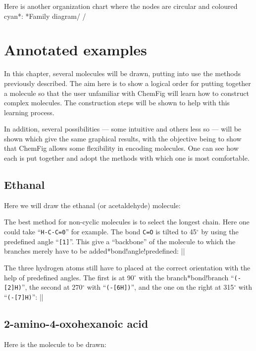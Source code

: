\documentclass[10pt]{article}
\makeatletter
\newcommand\idx{\@ifstar{\let\print@or@not\@gobble\idx@}{\let\print@or@not\@firstofone\idx@}}
\newcommand\idx@[1]{%
	\ifcat\expandafter\noexpand\@car#1\@nil\relax%
		\expandafter\ifx\@car#1\@nil\protect
			\index{#1}%
			\print@or@not{#1}%
		\else
			\saveexpandmode\expandarg
			\StrSubstitute{\string#1}{\string @}{\@empty\protect\symbol{'100}}[\temp@]%
			\StrGobbleLeft\temp@1[\temp@]%
			\restoreexpandmode
			\expandafter\index\expandafter{\temp@ @\protect\texttt{\protect\textbackslash\temp@}}%
			\print@or@not{\texttt{\string#1}}%
		\fi
	\else
		\index{#1}%
		\print@or@not{#1}%
	\fi
}
\newcommand\make@car@active[1]{%
	\catcode`#1\active
	\begingroup
		\lccode`\~`#1\relax
		\lowercase{\endgroup\def~}%
}
\newif\if@exstar
\newcommand\exemple{%
	\begingroup
	\parskip\z@
	\@makeother\;\@makeother\!\@makeother\?\@makeother\:%
	\@ifstar{\@exstartrue\exemple@}{\@exstarfalse\exemple@}}
\newcommand\exemple@[2][65]{%
	\medbreak\noindent
	\begingroup
		\let\do\@makeother\dospecials
		\make@car@active\ { {}}%
		\make@car@active\^^M{\par\leavevmode}%
		\make@car@active\,{\leavevmode\kern\z@\string,}%
		\make@car@active\-{\leavevmode\kern\z@\string-}%
		\make@car@active\>{\leavevmode\kern\z@\string>}%
		\make@car@active\<{\leavevmode\kern\z@\string<}%
		\exemple@@{#1}{#2}%
}
\newcommand\exemple@@[3]{%
	\def\@tempa##1#3{\exemple@@@{#1}{#2}{##1}}%
	\@tempa
}
\newcommand\exemple@@@[3]{%
	\xdef\the@code{#3}%
	\endgroup
	\if@exstar
		\begingroup
			\fboxrule0.4pt
			\let\breakboxparindent\z@
			\def\bkvz@bottom{\hrule\@height\fboxrule}%
			\let\bkvz@before@breakbox\relax
			\def\bkvz@set@linewidth{\advance\linewidth\dimexpr-2\fboxrule-2\fboxsep}%
			\def\bkvz@left{\vrule\@width\fboxrule\hskip\fboxsep}%
			\def\bkvz@right{\hskip\fboxsep\vrule\@width\fboxrule}%
			\def\bkvz@top{\hbox to \hsize{%
				\vrule\@width\fboxrule\@height\fboxrule
				\leaders\bkvz@bottom\hfill
				\ECFAugie
				\fboxsep\z@
				\colorbox{black}{\kern0.25em\color{white}\footnotesize\lower0.5ex\hbox{\strut#2}\kern0.25em}%
				\leaders\bkvz@bottom\hfill
				\vrule\@width\fboxrule\@height\fboxrule}}%
			\breakbox
				\kern.5ex\relax
				\ttfamily\footnotesize\the@code\par
				\normalfont
				\kern3pt
				\hrule height0.1pt width\linewidth depth0.1pt
				\vskip5pt
				\rightskip0pt plus 1fill
				\everypar{{\color{lightgray}\rlap{\vrule height0.1pt width\linewidth depth0.1pt}}\hskip0pt plus 1fill}%
				\newlinechar`\^^M\everyeof{\noexpand}\scantokens{#3}\par
			\endbreakbox
		\endgroup
	\else
		\vskip0.5ex
		\boxput*(0,1)
			{\fboxsep\z@
			\hbox{\ECFAugie\colorbox{black}{\leavevmode\kern0.25em{\color{white}\footnotesize\strut#2}\kern0.25em}}%
			}%
			{\fboxsep5pt
			\fbox{%
				$\vcenter{\hsize\dimexpr0.#1\linewidth-\fboxsep-\fboxrule\relax
					\kern5pt\parskip0pt \ttfamily\footnotesize\the@code}%
				\vcenter{\kern5pt\hsize\dimexpr\linewidth-0.#1\linewidth-\fboxsep-\fboxrule\relax
					\everypar{{\color{lightgray}\rlap{\vrule height0.1pt width\dimexpr\linewidth-0.#1\linewidth-\fboxsep-\fboxrule depth0.1pt}}}%
					\footnotesize\newlinechar`\^^M\everyeof{\noexpand}\scantokens{#3}}$%
				}%
			}%
	\fi
	\medbreak
	\endgroup
}
\let\do\@makeother\dospecials
\def\degres{\ensuremath{{}^\circ}}
\newcommand\CF{{\ECFAugie ChemFig}\xspace}
\makeatother
\begin{document}
Here is another organization chart where the nodes are circular and coloured cyan\idx*{\printatom}:
\exemple*{Family diagram}/
\setbondoffset{0pt}
\setatomsep{80pt}
\renewcommand\printatom[1]{\textsf{#1}}
/

\section{Annotated examples}\label{exemples.commentes}
In this chapter, several molecules will be drawn, putting into use the methods previously described. The aim here is to show a logical order for putting together a molecule so that the user unfamiliar with \CF will learn how to construct complex molecules. The construction steps will be shown to help with this learning process.

In addition, several possibilities --- some intuitive and others less so --- will be shown which give the same graphical results, with the objective being to show that \CF allows some flexibility in encoding molecules. One can see how each is put together and adopt the methods with which one is most comfortable.

\subsection{Ethanal}
Here we will draw the ethanal (or acetaldehyde) molecule: 

The best method for non-cyclic molecules is to select the longest chain. Here one could take ``\verb|H-C-C=0|'' for example. The bond \verb|C=O| is tilted to 45\degres{} by using the predefined angle ``\verb-[1]-''. This give a ``backbone'' of the molecule to which the branches merely have to be added\idx*{bond!angle!predefined}:
\exemple{Backbone of ethanal}||

The three hydrogen atoms still have to placed at the correct orientation with the help of predefined angles. The first is at 90\degres{} with the branch\idx*{bond!branch} ``\verb/(-[2]H)/'', the second at 270\degres{} with ``\verb/(-[6H])/'', and the one on the right at 315\degres{} with ``\verb/(-[7]H)/'':
\exemple{Ethanal}||

\subsection{2-amino-4-oxohexanoic acid}
Here is the molecule to be drawn: 
\end{document}
